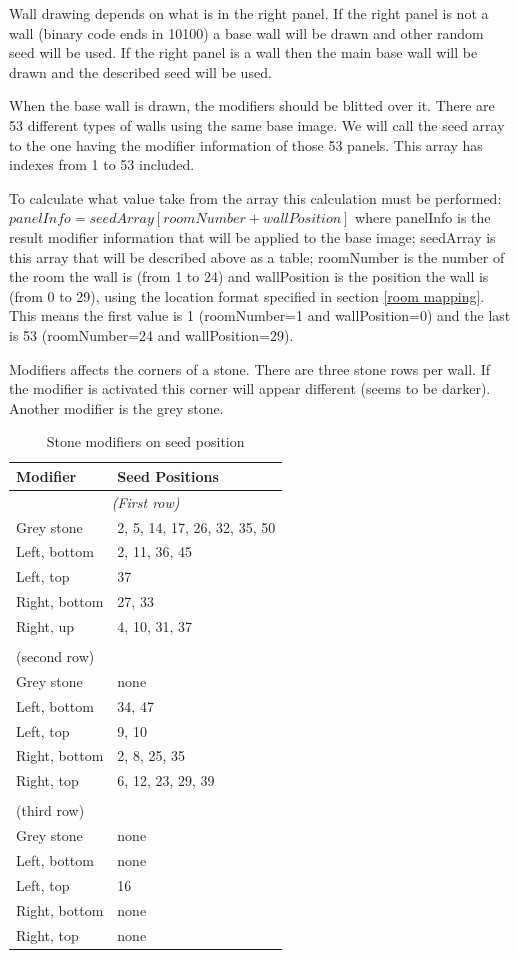 \documentclass{article}
\begin{document}
 Wall drawing depends on what is in the right panel. If the right panel
 is not a wall (binary code ends in 10100) a base wall will be drawn and
 other random seed will be used. If the right panel is a wall then the main
 base wall will be drawn and the described seed will be used.

 When the base wall is drawn, the modifiers should be blitted over it.
 There are 53 different types of walls using the same base image.
 We will call the seed array to the one having the modifier information of
 those 53 panels. This array has indexes from 1 to 53 included.

 To calculate what value take from the array this calculation must be
 performed: $panelInfo=seedArray[roomNumber+wallPosition]$
 where panelInfo is the result modifier information that will be applied to
 the base image; seedArray is this array that will be described above as a
 table; roomNumber is the number of the room the wall is (from 1 to 24)
 and wallPosition is the position the wall is (from 0 to 29), using the
 location format specified in section \ref{room mapping}. This means the first value is
 1 (roomNumber=1 and wallPosition=0) and the last is 53 (roomNumber=24
 and wallPosition=29).

 Modifiers affects the corners of a stone. There are three stone rows per
 wall. If the modifier is activated this corner will appear different
 (seems to be darker). Another modifier is the grey stone.

\begin{table}
\begin{tabular}{ll}
\hline
 Modifier      & Seed Positions \\
\hline
 \multicolumn{2}{c}{{\it (First row)}} \\
\hline
 Grey stone    & 2, 5, 14, 17, 26, 32, 35, 50 \\
 Left, bottom  & 2, 11, 36, 45 \\
 Left, top     & 37 \\
 Right, bottom & 27, 33 \\
 Right, up     & 4, 10, 31, 37 \\
 \\
\hline
 (second row) \\
\hline
 Grey stone    & none  \\
 Left, bottom  & 34, 47 \\
 Left, top     & 9, 10 \\
 Right, bottom & 2, 8, 25, 35 \\
 Right, top    & 6, 12, 23, 29, 39 \\
 \\
\hline
 (third row) \\
\hline
 Grey stone    & none  \\
 Left, bottom  & none \\
 Left, top     & 16 \\
 Right, bottom & none \\
 Right, top    & none \\
\hline
\end{tabular}
\caption{Stone modifiers on seed position}
\label{seeds}
\end{table}
\end{document}
